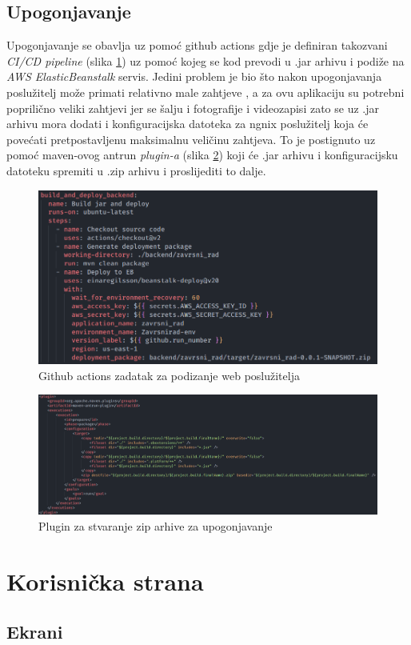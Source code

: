 \documentclass[times, utf8, zavrsni]{fer}
\begin{document}
\section{Upogonjavanje}
Upogonjavanje se obavlja uz pomoć github actions gdje je definiran takozvani \textit{CI/CD pipeline}
(slika \ref{fig:Backend cicd}) uz pomoć kojeg se kod prevodi u .jar arhivu i podiže na \textit{AWS ElasticBeanstalk} servis.
Jedini problem je bio što nakon upogonjavanja poslužitelj može primati relativno male zahtjeve
, a za ovu aplikaciju su potrebni poprilično veliki zahtjevi jer se šalju i fotografije i videozapisi
zato se uz .jar arhivu mora dodati i konfiguracijska datoteka za ngnix poslužitelj koja će povećati
pretpostavljenu maksimalnu veličinu zahtjeva. To je postignuto uz pomoć maven-ovog antrun \textit{plugin-a}
(slika \ref{fig:antrun}) koji će .jar arhivu i konfiguracijsku datoteku spremiti u .zip arhivu i proslijediti to dalje.
\begin{figure}[h]
      \centering
      \includegraphics[width=.5\textwidth]{backend_cicd.png}
      \caption{Github actions zadatak za podizanje web poslužitelja}
      \label{fig:Backend cicd}
\end{figure}
\begin{figure}[h]
      \centering
      \includegraphics[width=\textwidth]{antrun.png}
      \caption{Plugin za stvaranje zip arhive za upogonjavanje}
      \label{fig:antrun}
\end{figure}
\chapter{Korisnička strana}
\section{Ekrani}
\end{document}
